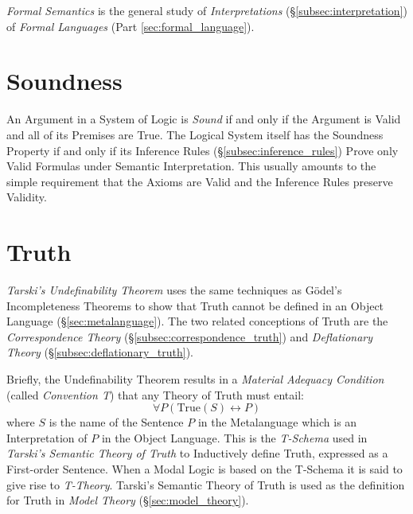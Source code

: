 \documentclass{article}
\begin{document}
\emph{Formal Semantics} is the general study of \emph{Interpretations}
(\S\ref{subsec:interpretation}) of \emph{Formal Languages} (Part
\ref{sec:formal_language}).



\section{Soundness}\label{sec:soundness}

An Argument in a System of Logic is \emph{Sound} if and only if the
Argument is Valid and all of its Premises are True. The Logical System
itself has the Soundness Property if and only if its Inference Rules
(\S\ref{subsec:inference_rules}) Prove only Valid Formulas under
Semantic Interpretation. This usually amounts to the simple
requirement that the Axioms are Valid and the Inference Rules preserve
Validity.



\section{Truth}\label{sec:semantic_truth}

\emph{Tarski's Undefinability Theorem} \cite{tarski36} uses the same
techniques as G\"odel's Incompleteness Theorems to show that Truth
cannot be defined in an Object Language
(\S\ref{sec:metalanguage}). The two related conceptions of Truth are
the \emph{Correspondence Theory} (\S\ref{subsec:correspondence_truth})
and \emph{Deflationary Theory} (\S\ref{subsec:deflationary_truth}).

Briefly, the Undefinability Theorem results in a \emph{Material
  Adequacy Condition} (called \emph{Convention T}) that any Theory of
Truth must entail:
\[
    \forall P (\mathrm{True}(S) \leftrightarrow P)
\]
where $S$ is the name of the Sentence $P$ in the Metalanguage which is
an Interpretation of $P$ in the Object Language. This is the
\emph{T-Schema} used in \emph{Tarski's Semantic Theory of Truth} to
Inductively define Truth, expressed as a First-order Sentence. When a
Modal Logic is based on the T-Schema it is said to give rise to
\emph{T-Theory}. Tarski's Semantic Theory of Truth is used as the
definition for Truth in \emph{Model Theory}
(\S\ref{sec:model_theory}).
\end{document}
